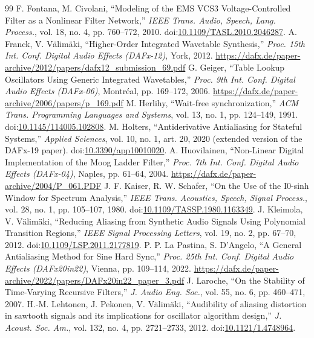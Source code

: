 \documentclass[conference]{IEEEtran}
\begin{document}
\begin{thebibliography}{99}
 F. Fontana, M. Civolani, ``Modeling of the EMS VCS3 Voltage-Controlled Filter as a Nonlinear Filter Network,'' \emph{IEEE Trans. Audio, Speech, Lang. Process.}, vol. 18, no. 4, pp. 760–772, 2010. doi:\href{https://doi.org/10.1109/TASL.2010.2046287}{10.1109/TASL.2010.2046287}.
 A. Franck, V. Välimäki, ``Higher-Order Integrated Wavetable Synthesis,'' \emph{Proc. 15th Int. Conf. Digital Audio Effects (DAFx-12)}, York, 2012. \url{https://dafx.de/paper-archive/2012/papers/dafx12_submission_69.pdf}
 G. Geiger, ``Table Lookup Oscillators Using Generic Integrated Wavetables,'' \emph{Proc. 9th Int. Conf. Digital Audio Effects (DAFx-06)}, Montréal, pp. 169–172, 2006. \url{https://dafx.de/paper-archive/2006/papers/p_169.pdf}
 M. Herlihy, ``Wait-free synchronization,'' \emph{ACM Trans. Programming Languages and Systems}, vol. 13, no. 1, pp. 124–149, 1991. doi:\href{https://doi.org/10.1145/114005.102808}{10.1145/114005.102808}.
 M. Holters, ``Antiderivative Antialiasing for Stateful Systems,'' \emph{Applied Sciences}, vol. 10, no. 1, art. 20, 2020 (extended version of the DAFx-19 paper). doi:\href{https://doi.org/10.3390/app10010020}{10.3390/app10010020}.
 A. Huovilainen, ``Non-Linear Digital Implementation of the Moog Ladder Filter,'' \emph{Proc. 7th Int. Conf. Digital Audio Effects (DAFx-04)}, Naples, pp. 61–64, 2004. \url{https://dafx.de/paper-archive/2004/P_061.PDF}
 J. F. Kaiser, R. W. Schafer, ``On the Use of the I0-sinh Window for Spectrum Analysis,'' \emph{IEEE Trans. Acoustics, Speech, Signal Process.}, vol. 28, no. 1, pp. 105–107, 1980. doi:\href{https://doi.org/10.1109/TASSP.1980.1163349}{10.1109/TASSP.1980.1163349}.
 J. Kleimola, V. Välimäki, ``Reducing Aliasing from Synthetic Audio Signals Using Polynomial Transition Regions,'' \emph{IEEE Signal Processing Letters}, vol. 19, no. 2, pp. 67–70, 2012. doi:\href{https://doi.org/10.1109/LSP.2011.2177819}{10.1109/LSP.2011.2177819}.
 P. P. La Pastina, S. D'Angelo, ``A General Antialiasing Method for Sine Hard Sync,'' \emph{Proc. 25th Int. Conf. Digital Audio Effects (DAFx20in22)}, Vienna, pp. 109–114, 2022. \url{https://dafx.de/paper-archive/2022/papers/DAFx20in22_paper_3.pdf}
 J. Laroche, ``On the Stability of Time-Varying Recursive Filters,'' \emph{J. Audio Eng. Soc.}, vol. 55, no. 6, pp. 460–471, 2007.
 H.-M. Lehtonen, J. Pekonen, V. Välimäki, ``Audibility of aliasing distortion in sawtooth signals and its implications for oscillator algorithm design,'' \emph{J. Acoust. Soc. Am.}, vol. 132, no. 4, pp. 2721–2733, 2012. doi:\href{https://doi.org/10.1121/1.4748964}{10.1121/1.4748964}.

\end{thebibliography}
\end{document}
